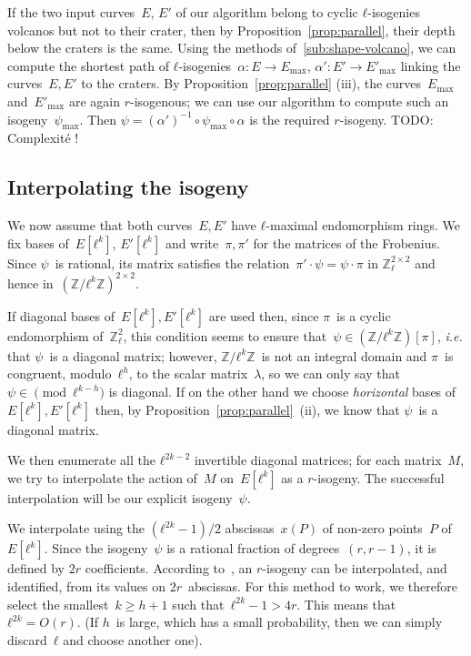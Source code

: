 \documentclass{lms}
\newcommand{\todo}[1]{{\color{red}TODO: #1}}
\begin{document}
If the two input curves~$E$, $E'$ of our algorithm
belong to cyclic $ℓ$-isogenies volcanos but not to their crater,
then by Proposition~\ref{prop:parallel},
their depth below the craters is the same.
Using the methods of~\ref{sub:shape-volcano},
we can compute the shortest path of $ℓ$-isogenies~$α: E → E_{\max}$,
$α': E' → E'_{\max}$ linking the curves~$E, E'$ to the craters.
By Proposition~\ref{prop:parallel} (iii),
the curves~$E_{\max}$ and~$E'_{\max}$ are again $r$-isogenous;
we can use our algorithm to compute such an isogeny~$ψ_{\max}$.
Then $ψ = (α')^{-1} ∘ ψ_{\max} ∘ α$ is the required $r$-isogeny.
\todo{Complexité !}


\subsection{Interpolating the isogeny}

We now assume that both curves~$E, E'$
have $ℓ$-maximal endomorphism rings.
We fix bases of~$E[ℓ^k]$, $E'[ℓ^k]$ and write~$π, π'$ for the matrices
of the Frobenius.
Since $ψ$~is rational, its matrix satisfies the relation~$π' · ψ = ψ · π$
in $ℤ_ℓ^{2×2}$ and hence in~$(ℤ/ℓ^k ℤ)^{2 × 2}$.

If diagonal bases of~$E[ℓ^k], E'[ℓ^k]$ are used then,
since $π$~is a cyclic endomorphism of~$ℤ_ℓ^2$,
this condition seems to ensure that~$ψ ∈ (ℤ/ℓ^k ℤ)[π]$,
\emph{i.e.} that $ψ$~is a diagonal matrix;
however, $ℤ/ℓ^k ℤ$~is not an integral domain
and $π$~is congruent, modulo~$ℓ^h$, to the scalar matrix~$λ$,
so we can only say that~$ψ ∈ \pmod{ℓ^{k-h}}$ is diagonal.
If on the other hand we choose \emph{horizontal} bases
of~$E[ℓ^k], E'[ℓ^k]$ then, by Proposition~\ref{prop:parallel}~(ii),
we know that $ψ$~is a diagonal matrix.

We then enumerate all the $ℓ^{2k-2}$ invertible diagonal matrices;
for each matrix~$M$, we try to interpolate
the action of~$M$ on~$E[ℓ^k]$ as a $r$-isogeny.
The successful interpolation will be our explicit isogeny~$ψ$.

We interpolate using
the $(ℓ^{2k}-1)/2$ abscissas~$x(P)$ of non-zero points~$P$ of $E[ℓ^k]$.
Since the isogeny~$ψ$ is a rational fraction of degrees~$(r, r-1)$,
it is defined by $2r$ coefficients.
According to~\cite[§3.1]{df10},
an $r$-isogeny can be interpolated, and identified,
from its values on $2r$~abscissas.
For this method to work, we therefore select the smallest~$k ≥ h+1$
such that~$ℓ^{2k}-1 > 4r$.
This means that $ℓ^{2k} = O(r)$.
(If $h$~is large, which has a small probability,
then we can simply discard~$ℓ$ and choose another one).
\end{document}
